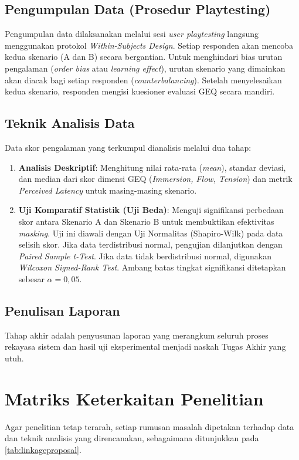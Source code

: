 \subsection{Pengumpulan Data (Prosedur Playtesting)}
Pengumpulan data dilaksanakan melalui sesi \textit{user playtesting} langsung menggunakan protokol \textit{Within-Subjects Design}. Setiap responden akan mencoba kedua skenario (A dan B) secara bergantian. Untuk menghindari bias urutan pengalaman (\textit{order bias} atau \textit{learning effect}), urutan skenario yang dimainkan akan diacak bagi setiap responden (\textit{counterbalancing}). Setelah menyelesaikan kedua skenario, responden mengisi kuesioner evaluasi GEQ secara mandiri.

\subsection{Teknik Analisis Data}
Data skor pengalaman yang terkumpul dianalisis melalui dua tahap:
\begin{enumerate}
    \item \textbf{Analisis Deskriptif}: Menghitung nilai rata-rata (\textit{mean}), standar deviasi, dan median dari skor dimensi GEQ (\textit{Immersion, Flow, Tension}) dan metrik \textit{Perceived Latency} untuk masing-masing skenario.
    \item \textbf{Uji Komparatif Statistik (Uji Beda)}: Menguji signifikansi perbedaan skor antara Skenario A dan Skenario B untuk membuktikan efektivitas \textit{masking}. Uji ini diawali dengan Uji Normalitas (Shapiro-Wilk) pada data selisih skor. Jika data terdistribusi normal, pengujian dilanjutkan dengan \textit{Paired Sample t-Test}. Jika data tidak berdistribusi normal, digunakan \textit{Wilcoxon Signed-Rank Test}. Ambang batas tingkat signifikansi ditetapkan sebesar $\alpha = 0,05$.
\end{enumerate}

\subsection{Penulisan Laporan}
Tahap akhir adalah penyusunan laporan yang merangkum seluruh proses rekayasa sistem dan hasil uji eksperimental menjadi naskah Tugas Akhir yang utuh.

\section{Matriks Keterkaitan Penelitian}
Agar penelitian tetap terarah, setiap rumusan masalah dipetakan terhadap data dan teknik analisis yang direncanakan, sebagaimana ditunjukkan pada \cref{tab:linkageproposal}.

